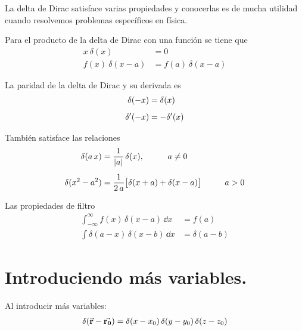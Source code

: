 La delta de Dirac satisface varias propiedades y conocerlas es de mucha utilidad cuando resolvemos problemas específicos en física. 
\par

\begin{propiedad}
Para el producto de la delta de Dirac con una función se tiene que
\begin{align}
x \: \delta(x) &= 0 \\[0.5em]
f(x) \: \delta(x - a) &= f(a) \: \delta(x - a)
\end{align}
\end{propiedad}

\begin{propiedad}
La paridad de la delta de Dirac y su derivada es
\begin{align}
\delta (-x) &= \delta (x) \\[0.5em]
{\delta}^{\prime} (-x) &= - {\delta}^{\prime} (x)
\end{align}

\end{propiedad}

\begin{propiedad}
También satisface las relaciones
\begin{align}
\delta(a \, x) &= \dfrac{1}{\abs{a}} \, \delta (x), \hspace{1cm} a \neq 0 \\[0.5em]
\delta (x^{2} - a^{2}) &= \dfrac{1}{2 \, a} \big[ \delta (x + a) + \delta (x - a) \big] \hspace{1cm} a > 0
\end{align}
\end{propiedad}

\begin{propiedad}
Las propiedades de filtro
\begin{align}
\int_{-\infty}^{\infty} f(x) \, \delta (x - a) \, \dd{x} &= f(a) \\[0.5em]
\int \delta (a - x) \, \delta (x - b) \, \dd{x} &= \delta (a - b)
\end{align}

\end{propiedad}

\section{Introduciendo más variables.}

Al introducir más variables:
\begin{align}
\delta (\va{\bm{r}} - \va{\bm{r_{0}}}) = \delta (x - x_{0}) \, \delta (y - y_{0}) \, \delta (z - z_{0})
\label{eq:ecuacion_A_03}
\end{align}

